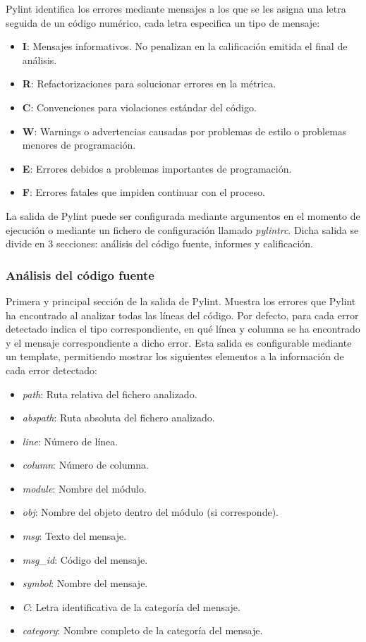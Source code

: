 \documentclass[a4paper, 12pt]{book}
\begin{document}
Pylint identifica los errores mediante mensajes a los que se les asigna una letra seguida de un código numérico, cada letra especifica un tipo de mensaje:
\begin{itemize}
	\item \textbf{I}: Mensajes informativos. No penalizan en la calificación emitida el final de análisis.
	\item \textbf{R}: Refactorizaciones para solucionar errores en la métrica.
	\item \textbf{C}: Convenciones para violaciones estándar del código.
	\item \textbf{W}: Warnings o advertencias causadas por problemas de estilo o problemas menores de programación.
	\item \textbf{E}: Errores debidos a problemas importantes de programación.
	\item \textbf{F}: Errores fatales que impiden continuar con el proceso.
\end{itemize}

La salida de Pylint puede ser configurada mediante argumentos en el momento de ejecución o mediante un fichero de configuración llamado \textit{pylintrc}.
Dicha salida se divide en 3 secciones: análisis del código fuente, informes y calificación.

\subsubsection{Análisis del código fuente}

Primera y principal sección de la salida de Pylint. Muestra los errores que Pylint ha encontrado al analizar todas las líneas del código.
Por defecto, para cada error detectado indica el tipo correspondiente, en qué línea y columna se ha encontrado y el mensaje correspondiente a dicho error.
Esta salida es configurable mediante un template, permitiendo mostrar los siguientes elementos a la información de cada error detectado:
\begin{itemize}
	\item \textit{path}: Ruta relativa del fichero analizado.
	\item \textit{abspath}: Ruta absoluta del fichero analizado.
	\item \textit{line}: Número de línea.
	\item \textit{column}: Número de columna.
	\item \textit{module}: Nombre del módulo.
	\item \textit{obj}: Nombre del objeto dentro del módulo (si corresponde).
	\item \textit{msg}: Texto del mensaje.
	\item \textit{msg\_id}: Código del mensaje.
	\item \textit{symbol}: Nombre del mensaje.
	\item \textit{C}: Letra identificativa de la categoría del mensaje.
	\item \textit{category}: Nombre completo de la categoría del mensaje.
\end{itemize} 
\end{document}
